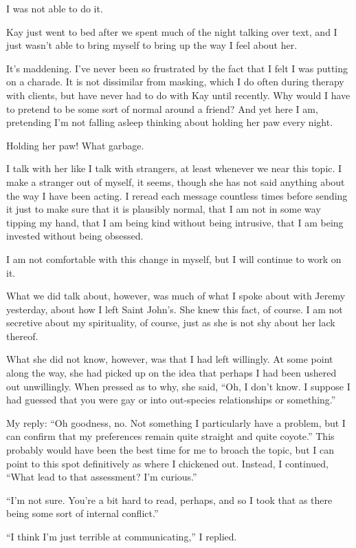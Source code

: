 I was not able to do it.

Kay just went to bed after we spent much of the night talking over text, and I just wasn't able to bring myself to bring up the way I feel about her.

It's maddening. I've never been so frustrated by the fact that I felt I was putting on a charade. It is not dissimilar from masking, which I do often during therapy with clients, but have never had to do with Kay until recently. Why would I have to pretend to be some sort of normal around a friend? And yet here I am, pretending I'm not falling asleep thinking about holding her paw every night.

Holding her paw! What garbage.

I talk with her like I talk with strangers, at least whenever we near this topic. I make a stranger out of myself, it seems, though she has not said anything about the way I have been acting. I reread each message countless times before sending it just to make sure that it is plausibly normal, that I am not in some way tipping my hand, that I am being kind without being intrusive, that I am being invested without being obsessed.

I am not comfortable with this change in myself, but I will continue to work on it.

What we did talk about, however, was much of what I spoke about with Jeremy yesterday, about how I left Saint John's. She knew this fact, of course. I am not secretive about my spirituality, of course, just as she is not shy about her lack thereof.

What she did not know, however, was that I had left willingly. At some point along the way, she had picked up on the idea that perhaps I had been ushered out unwillingly. When pressed as to why, she said, ``Oh, I don't know. I suppose I had guessed that you were gay or into out-species relationships or something.''

My reply: ``Oh goodness, no. Not something I particularly have a problem, but I can confirm that my preferences remain quite straight and quite coyote.'' This probably would have been the best time for me to broach the topic, but I can point to this spot definitively as where I chickened out. Instead, I continued, ``What lead to that assessment? I'm curious.''

``I'm not sure. You're a bit hard to read, perhaps, and so I took that as there being some sort of internal conflict.''

``I think I'm just terrible at communicating,'' I replied.

